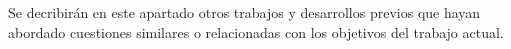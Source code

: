 Se decribirán en este apartado otros trabajos y desarrollos previos que hayan abordado cuestiones similares o relacionadas con los objetivos del trabajo actual.

